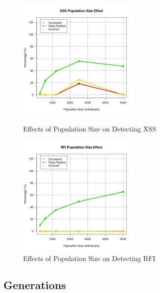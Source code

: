 \begin{appendices}
\begin{figure}[hp]
	\centering
	\includegraphics[height=225px]{./assets/appendix/fullresults/ga/pop/Results_XSS.png}
	\caption{Effects of Population Size on Detecting XSS}
	\includegraphics[height=225px]{./assets/appendix/fullresults/ga/pop/Results_RFI.png}
	\caption{Effects of Population Size on Detecting RFI}
\end{figure}

\newpage
\subsection{Generations} \label{app:resGeneration}


\end{appendices}
